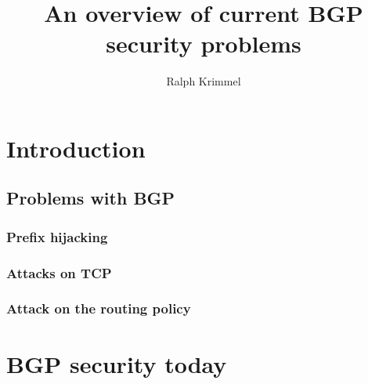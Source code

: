 \documentclass[]{IEEEtran}
\author{Ralph Krimmel}
\title{An overview of current BGP security problems}
\begin{document}
	\maketitle
	\begin{abstract}
	\end{abstract}
	\section{Introduction}
%
%
	\subsection{Problems with BGP}
		\subsubsection{Prefix hijacking}
%	
		\subsubsection{Attacks on TCP}
		\subsubsection{Attack on the routing policy} 
%
%
%
	\section{BGP security today}
%	
%
%
\end{document}
